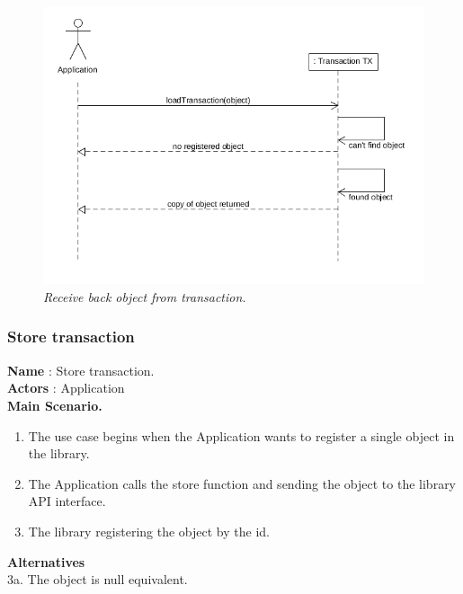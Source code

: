 \documentclass[12pt]{article}
\begin{document}
{\begin{figure}[h!]
\centering
\includegraphics[scale=0.5]{Pictures/load.png}
\caption{\textit{\color{gray}Receive back object from transaction.}}
\end{figure}

\subsubsection{Store transaction}
\textbf{Name} : Store transaction.\\
\textbf{Actors} : Application\\
\textbf{Main Scenario.}
\begin{enumerate}
  \item The use case begins when the Application wants to register a single object in the library.
  \item The Application calls the store function and sending the object to the library API interface.
  \item The library registering the object by the id.
\end{enumerate}
\textbf{Alternatives}\\
3a. The object is null equivalent.\\

}
\end{document}
